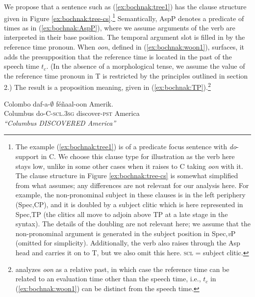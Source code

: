 \documentclass[output=paper,newtxmath,modfonts,nonflat,draftmode]{langsci/langscibook}
\begin{document}
We propose that a sentence such as (\ref{ex:bochnak:tree1}) has the clause
structure given in Figure \ref{ex:bochnak:tree-cs}.\footnote{The example
  (\ref{ex:bochnak:tree1}) is of a predicate focus sentence with
  \textit{do}-support in C. We choose this clause type for
  illustration as the verb here stays low, unlike in some other cases
  when it raises to C taking \textit{oon} with it. The clause structure
 in Figure \ref{ex:bochnak:tree-cs} is somewhat simplified from what \cite{Martinovic2015b} assumes; any
differences are not relevant for our analysis here. For example, the
non-pronominal subject in these clauses is in the left periphery
(Spec,CP), and it is doubled by a subject clitic which is here
represented in Spec,TP (the clitics all move to adjoin above TP at a
late stage in the syntax). The details of the doubling are not
relevant here; we assume that the non-pronominal argument is generated
in the subject position in Spec,\textit{v}P (omitted for simplicity). Additionally, the verb also
raises through the Asp head and carries it on to T, but we also omit this
here. \textsc{scl} = subject clitic.} Semantically, AspP denotes a predicate of times as in (\ref{ex:bochnak:AspP}), where we assume arguments of the verb are interpreted in their base position. The temporal argument slot is filled in by the reference time pronoun. When  \textit{oon}, defined in (\ref{ex:bochnak:woon1}), surfaces, it adds the presupposition that the reference time is located in the past of the speech time $t_c$. (In the absence of a morphological tense, we assume the value of the reference time pronoun in T is restricted by the principles outlined in section 2.) The result is a proposition meaning, given in (\ref{ex:bochnak:TP}).\footnote{\citet{robert91approche} analyzes \textit{oon} as a relative past, in which case the reference time can be related to an evaluation time other than the speech time, i.e., $t_c$ in (\ref{ex:bochnak:woon1}) can be distinct from the speech time.}

\ea\label{ex:bochnak:tree1} \gll Colombo daf-a-$\emptyset$ f\'e\~naal-oon Amerik.\\
Columbus do-C-\textsc{scl.3sg} discover-\textsc{pst} America\\
\glt\textit{``Columbus DISCOVERED America''}
\z

\end{document}
